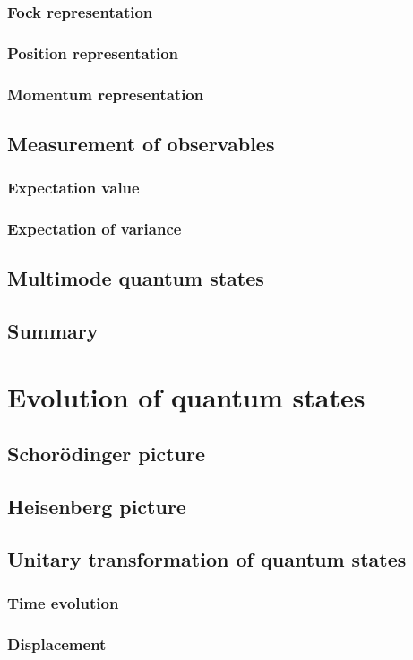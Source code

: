 \documentclass{book}
\begin{document}
\subsection{Fock representation}
\subsection{Position representation}
\subsection{Momentum representation}
\section{Measurement of observables}
\subsection{Expectation value}
\subsection{Expectation of variance}
\section{Multimode quantum states}
\section{Summary}

\chapter{Evolution of quantum states}
\section{Schor\"odinger picture}
\section{Heisenberg picture}
\section{Unitary transformation of quantum states}
\subsection{Time evolution}
\subsection{Displacement}
\end{document}
